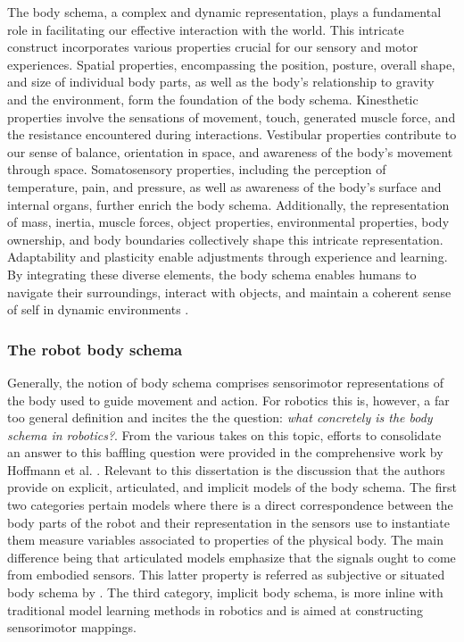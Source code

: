 The body schema, a complex and dynamic representation, plays a fundamental role in facilitating our effective interaction with the world. This intricate construct incorporates various properties crucial for our sensory and motor experiences. Spatial properties, encompassing the position, posture, overall shape, and size of individual body parts, as well as the body's relationship to gravity and the environment, form the foundation of the body schema. Kinesthetic properties involve the sensations of movement, touch, generated muscle force, and the resistance encountered during interactions. Vestibular properties contribute to our sense of balance, orientation in space, and awareness of the body's movement through space. Somatosensory properties, including the perception of temperature, pain, and pressure, as well as awareness of the body's surface and internal organs, further enrich the body schema. Additionally, the representation of mass, inertia, muscle forces, object properties, environmental properties, body ownership, and body boundaries collectively shape this intricate representation. Adaptability and plasticity enable adjustments through experience and learning. By integrating these diverse elements, the body schema enables humans to navigate their surroundings, interact with objects, and maintain a coherent sense of self in dynamic environments \cite{Vignemont20213C1Whatisbody,Morasso2015Revisitingbodyschema,Asada2018168Proprioceptionbodyschema}.


\subsubsection{The robot body schema}
Generally, the notion of body schema comprises sensorimotor representations of the body used to guide movement and action. For robotics this is, however, a far too general definition and incites the the question: \textit{what concretely is the body schema in robotics?}. From the various takes on this topic, efforts to consolidate an answer to this baffling question were provided in the comprehensive work by Hoffmann et al. \cite{Hoffmann2010Bodyschemarobotics}. Relevant to this dissertation is the discussion that the authors provide on explicit, articulated, and implicit models of the body schema. The first two categories pertain models where there is a direct correspondence between the body parts of
the robot and their representation in the sensors use to instantiate them measure variables associated to properties of the physical body. The main difference being that articulated models \cite{Grush2004emulationtheoryrepresentation} emphasize that the signals ought to come from embodied sensors. This latter property is referred as subjective or situated body schema by \cite{Hersch2008Onlinelearningbody}. The third category, implicit body schema, is more inline with traditional model learning methods in robotics and is aimed at constructing sensorimotor mappings.


